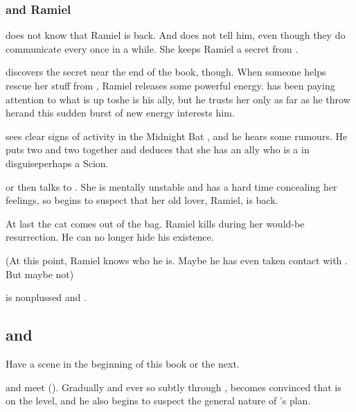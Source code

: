\subsubsection{\Secherdamon{} and Ramiel}
\Secherdamon{} does not know that Ramiel is back. 
And \Shiaraid{} does not tell him, even though they do communicate every once in a while. 
She keeps Ramiel a secret from \Secherdamon.

\Secherdamon{} discovers the secret near the end of the book, though. 
When someone helps \Shiaraid{} rescue her stuff from \Redce, Ramiel releases some powerful energy. 
\Secherdamon{} has been paying attention to what \Shiaraid{} is up to\dash she is his ally, but he trusts her only as far as he throw her\dash and this sudden burst of new energy interests him. 

\Secherdamon{} sees clear signs of activity in the Midnight Bat \matrix, and he hears some rumours. 
He puts two and two together and deduces that she has an ally who is a \resphan{} in disguise\dash perhaps a Scion. 

\Secherdamon{} or \Vizsherioch{} then talks to \Shiaraid. 
She is mentally unstable and has a hard time concealing her feelings, so \Secherdamon{} begins to suspect that her old lover, Ramiel, is back. 

At last the cat comes out of the bag. 
Ramiel kills \Shiaraid{} during her would-be resurrection. 
He can no longer hide his existence. 

(At this point, Ramiel knows who he is. 
 Maybe he has even taken contact with \Cishiel{}. 
 But maybe not) 

\Secherdamon{} is nonplussed and . 









\subsection{\Ishnaruchaefir and \Azraid}
Have a scene in the beginning of this book or the next.

\Ishnaruchaefir and \Azraid meet (). 
Gradually and ever so subtly through \SentinelsofMithEmph, \Ishnaruchaefir becomes convinced that \Azraid is on the level, and he also begins to suspect the general nature of \Azraid's plan. 

